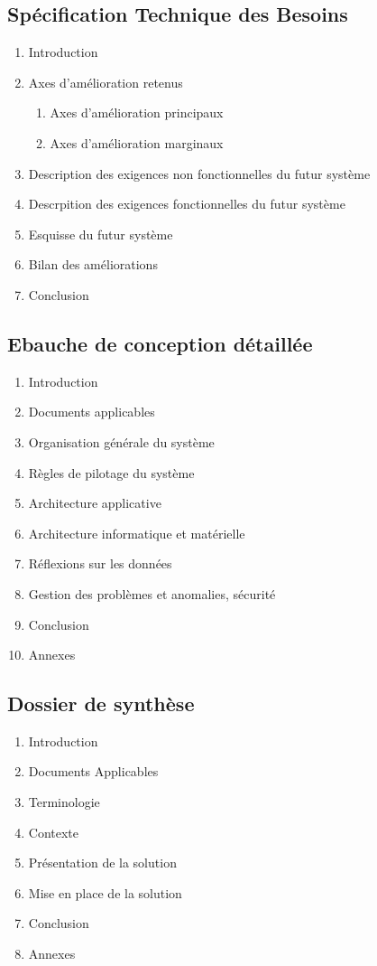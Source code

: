 \subsection{Spécification Technique des Besoins}
\begin{enumerate}
\item Introduction
\item Axes d'amélioration retenus
\begin{enumerate}
\item Axes d'amélioration principaux
\item Axes d'amélioration marginaux
\end{enumerate}
\item Description des exigences non fonctionnelles du futur système
\item Descrpition des exigences fonctionnelles du futur système
\item Esquisse du futur système
\item Bilan des améliorations
\item Conclusion
\end{enumerate}

\subsection{Ebauche de conception détaillée}
\begin{enumerate}
\item Introduction
\item Documents applicables
\item Organisation générale du système
\item Règles de pilotage du système
\item Architecture applicative
\item Architecture informatique et matérielle
\item Réflexions sur les données
\item Gestion des problèmes et anomalies, sécurité
\item Conclusion
\item Annexes
\end{enumerate}

\subsection{Dossier de synthèse}
\begin{enumerate}
\item Introduction
\item Documents Applicables
\item Terminologie
\item Contexte
\item Présentation de la solution
\item Mise en place de la solution
\item Conclusion
\item Annexes
\end{enumerate}
